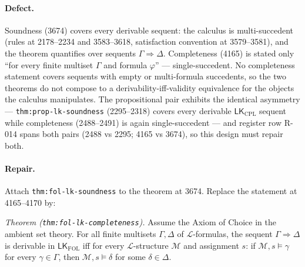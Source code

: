 \paragraph{Defect.}
Soundness (3674) covers every derivable sequent: the calculus is
multi-succedent (rules at 2178--2234 and 3583--3618, satisfaction convention at
3579--3581), and the theorem quantifies over sequents
\(\Gamma\Rightarrow\Delta\).  Completeness (4165) is stated only ``for every
finite multiset \(\Gamma\) and formula \(\varphi\)'' --- single-succedent.  No
completeness statement covers sequents with empty or multi-formula succedents,
so the two theorems do not compose to a derivability-iff-validity equivalence
for the objects the calculus manipulates.  The propositional pair exhibits the
identical asymmetry --- \texttt{thm:prop-lk-soundness} (2295--2318) covers
every derivable \(\mathsf{LK}_{\mathrm{CPL}}\) sequent while completeness
(2488--2491) is again single-succedent --- and register row R-014 spans both
pairs (2488 vs 2295; 4165 vs 3674), so this design must repair both.

\paragraph{Repair.}
Attach \texttt{thm:fol-lk-soundness} to the theorem at 3674.  Replace the
statement at 4165--4170 by:

\emph{Theorem (\texttt{thm:fol-lk-completeness}).}  Assume the Axiom of Choice
in the ambient set theory.  For all finite multisets \(\Gamma,\Delta\) of
\(\mathcal{L}\)-formulas, the sequent \(\Gamma\Rightarrow\Delta\) is derivable
in \(\mathsf{LK}_{\mathrm{FOL}}\) iff for every \(\mathcal{L}\)-structure
\(\mathcal{M}\) and assignment \(s\): if \(\mathcal{M},s\models\gamma\) for
every \(\gamma\in\Gamma\), then \(\mathcal{M},s\models\delta\) for some
\(\delta\in\Delta\).

